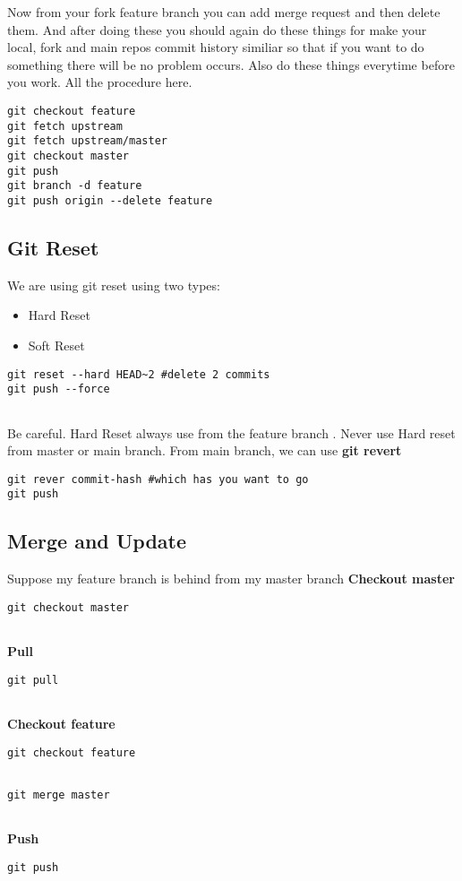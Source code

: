 \documentclass{article}
\begin{document}
Now from your fork feature branch you can add merge request and then delete
them.
And after doing these you should again do these things for make your local, fork and main repos commit history similiar so that if you want to do something there will be no problem occurs. Also do these things everytime before you work. All the procedure here. 
\begin{lstlisting}
git checkout feature
git fetch upstream
git fetch upstream/master
git checkout master
git push  
git branch -d feature
git push origin --delete feature 
\end{lstlisting}


\subsection{Git Reset}
We are using git reset using two types:
\begin{itemize}
	\item{Hard Reset}
	\item{Soft Reset}	
	
\end{itemize}
\begin{lstlisting}
git reset --hard HEAD~2 #delete 2 commits
git push --force
	
\end{lstlisting}
Be careful. Hard Reset always use from the feature branch . Never use Hard reset from master or main branch. 
From main branch, we can use \textbf{git revert}
\begin{lstlisting}
git rever commit-hash #which has you want to go 
git push 	
\end{lstlisting}

\subsection{Merge and Update}
Suppose my feature branch is behind from my master branch 
\textbf{Checkout master}
\begin{lstlisting}
git checkout master 
	
\end{lstlisting}
\textbf{Pull}
\begin{lstlisting}
git pull 
	
\end{lstlisting}
\textbf{Checkout feature}
\begin{lstlisting}
git checkout feature
	
\end{lstlisting}
\begin{lstlisting}
git merge master 
	
\end{lstlisting}
\textbf{Push}
\begin{lstlisting}
git push 
	
\end{lstlisting}
\end{document}
